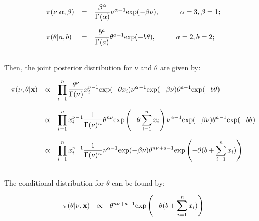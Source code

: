 \documentclass{article}
\begin{document}
\begin{equation*}
\begin{array}{lcl ll }

\pi(\nu|\alpha,\beta) & = & \dfrac{\beta^\alpha}{\Gamma(\alpha)} \nu^{\alpha -1} \mbox{exp}(-\beta\nu), \hspace{1cm} \alpha=3, \beta=1; \\ \\

\pi(\theta|a,b) & = & \dfrac{b^a}{\Gamma(a)} \theta^{a -1} \mbox{exp}(-b\theta), \hspace{1cm} a=2, b=2; \\ \\

 \end{array}
\end{equation*}

Then, the joint posterior distribution for $\nu$ and $\theta$ are given by:

\begin{equation*}
\begin{array}{lcl ll }

\pi(\nu, \theta|\textbf{x}) & \propto & \displaystyle\prod_{i=1}^{n} \dfrac{\theta^\nu}{\Gamma(\nu)} x_i^{\nu -1} \mbox{exp}(-\theta x_i)  \nu^{\alpha -1} \mbox{exp}(-\beta\nu) \theta^{a -1} \mbox{exp}(-b\theta)\\ \\

& \propto & \displaystyle\prod_{i=1}^{n}x_i^{\nu -1}  \dfrac{1}{\Gamma(\nu)^n} \theta^{n\nu} \mbox{exp}\left(-\theta \displaystyle\sum_{i=1}^{n}x_i\right)  \nu^{\alpha -1} \mbox{exp}(-\beta\nu) \theta^{a -1} \mbox{exp}(-b\theta)\\ \\

& \propto & \displaystyle\prod_{i=1}^{n}x_i^{\nu -1}  \dfrac{1}{\Gamma(\nu)^n} \nu^{\alpha -1} \mbox{exp}(-\beta\nu) \theta^{n\nu + a -1} \mbox{exp}\left(-\theta (b + \displaystyle\sum_{i=1}^{n}x_i)\right) \\ \\

 \end{array}
\end{equation*}

The conditional distribution for $\theta$ can be found by:

\begin{equation*}
\begin{array}{lcl ll }

\pi(\theta|\nu,\textbf{x}) & \propto & \theta^{n\nu + a -1} \mbox{exp}\left(-\theta (b + \displaystyle\sum_{i=1}^{n}x_i)\right) \\ \\

 \end{array}
\end{equation*}
\end{document}
